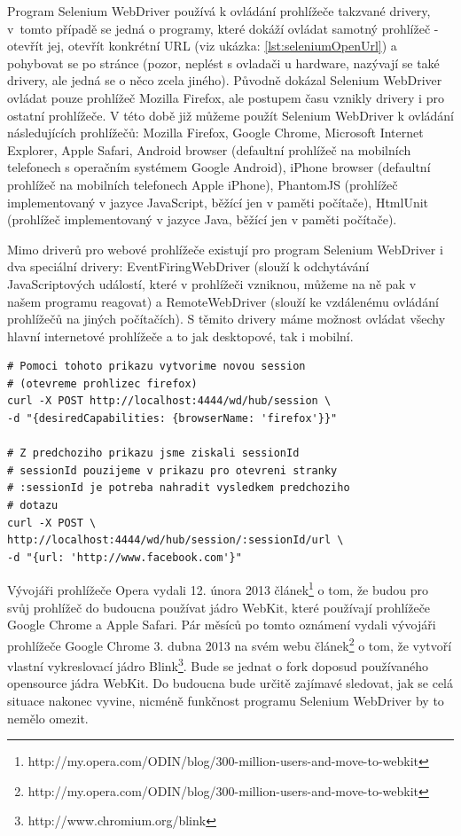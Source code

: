 \documentclass[thesis=M,czech]{FITthesis}[2013/05/10]
\begin{document}
Program Selenium WebDriver používá k ovládání prohlížeče takzvané drivery, v~tomto případě se jedná o programy, které dokáží ovládat samotný prohlížeč - otevřít jej, otevřít konkrétní URL (viz ukázka: \ref{lst:seleniumOpenUrl}) a pohybovat se po stránce (pozor, neplést s ovladači u hardware, nazývají se také drivery, ale jedná se o něco zcela jiného). Původně dokázal Selenium WebDriver ovládat pouze prohlížeč Mozilla Firefox, ale postupem času vznikly drivery i pro ostatní prohlížeče. V této době již můžeme použít Selenium WebDriver k ovládání následujících prohlížečů: Mozilla Firefox, Google Chrome, Microsoft Internet Explorer, Apple Safari, Android browser (defaultní prohlížeč na mobilních telefonech s operačním systémem Google Android), iPhone browser (defaultní prohlížeč na mobilních telefonech Apple iPhone), PhantomJS (prohlížeč implementovaný v jazyce JavaScript, běžící jen v paměti počítače), HtmlUnit (prohlížeč implementovaný v jazyce Java, běžící jen v paměti počítače). 

Mimo driverů pro webové prohlížeče existují pro program Selenium WebDriver i dva speciální drivery: EventFiringWebDriver (slouží k odchytávání JavaScriptových událostí, které v prohlížeči vzniknou, můžeme na ně pak v našem programu reagovat) a RemoteWebDriver (slouží ke vzdálenému ovládání prohlížečů na jiných počítačích). S těmito drivery máme možnost ovládat všechy hlavní internetové prohlížeče a to jak desktopové, tak i mobilní.

\begin{lstlisting}[caption={Příklad otevření url v seleniu pomocí CURL},label=lst:seleniumOpenUrl,belowcaptionskip=0.4cm]
# Pomoci tohoto prikazu vytvorime novou session 
# (otevreme prohlizec firefox)
curl -X POST http://localhost:4444/wd/hub/session \
-d "{desiredCapabilities: {browserName: 'firefox'}}"

# Z predchoziho prikazu jsme ziskali sessionId
# sessionId pouzijeme v prikazu pro otevreni stranky
# :sessionId je potreba nahradit vysledkem predchoziho
# dotazu
curl -X POST \
http://localhost:4444/wd/hub/session/:sessionId/url \
-d "{url: 'http://www.facebook.com'}" 
\end{lstlisting}

Vývojáři prohlížeče Opera vydali 12. února 2013 
článek\footnote{http://my.opera.com/ODIN/blog/300-million-users-and-move-to-webkit} o tom, že budou pro svůj prohlížeč do budoucna používat jádro WebKit, které používají prohlížeče Google Chrome a Apple Safari. Pár měsíců po tomto oznámení vydali vývojáři prohlížeče Google Chrome 3. dubna 2013 na svém webu článek\footnote{http://my.opera.com/ODIN/blog/300-million-users-and-move-to-webkit} o tom, že vytvoří vlastní vykreslovací jádro Blink\footnote{http://www.chromium.org/blink}. Bude se jednat o fork doposud používaného opensource jádra WebKit. Do budoucna bude určitě zajímavé sledovat, jak se celá situace nakonec vyvine, nicméně funkčnost programu Selenium WebDriver by to nemělo omezit.
\end{document}
